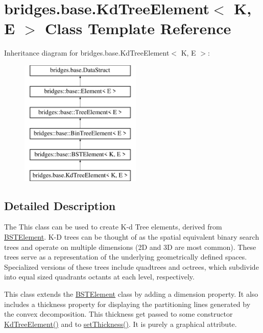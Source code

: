 \hypertarget{classbridges_1_1base_1_1_kd_tree_element}{}\section{bridges.\+base.\+Kd\+Tree\+Element$<$ K, E $>$ Class Template Reference}
\label{classbridges_1_1base_1_1_kd_tree_element}
Inheritance diagram for bridges.\+base.\+Kd\+Tree\+Element$<$ K, E $>$\+:\begin{figure}[H]
\begin{center}
\leavevmode
\includegraphics[height=6.000000cm]{classbridges_1_1base_1_1_kd_tree_element}
\end{center}
\end{figure}


\subsection{Detailed Description}
The This class can be used to create K-\/d Tree elements, derived from \hyperlink{classbridges_1_1base_1_1_b_s_t_element}{B\+S\+T\+Element}. K-\/D trees can be thought of as the spatial equivalent binary search trees and operate on multiple dimensions (2D and 3D are most common). These trees serve as a representation of the underlying geometrically defined spaces. Specialized versions of these trees include quadtrees and octrees, which subdivide into equal sized quadrants octants at each level, respectively. 

This class extends the \hyperlink{classbridges_1_1base_1_1_b_s_t_element}{B\+S\+T\+Element} class by adding a dimension property. It also includes a thickness property for displaying the partitioning lines generated by the convex decomposition. This thickness get passed to some constructor \hyperlink{classbridges_1_1base_1_1_kd_tree_element_a11cb855f1a151714ee24901a9e91e0da}{Kd\+Tree\+Element()} and to \hyperlink{classbridges_1_1base_1_1_kd_tree_element_a52412fc59c743a8a0ede057ed2451be9}{set\+Thickness()}. It is purely a graphical attribute.

